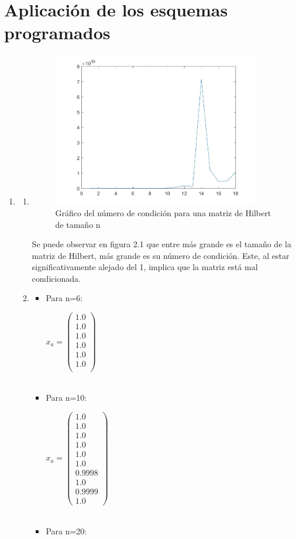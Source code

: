 \documentclass{udpreport}
\begin{document}
 \section{Aplicación de los esquemas programados}
 \begin{enumerate}
 	\item   
 		\begin{enumerate}
 			\item 	
 			\begin{figure}[H]
 				\centering
 				\includegraphics[width=9cm]{grafo1-a}
 				\caption{Gráfico del número de condición para una matriz de Hilbert de tamaño n}
 			\end{figure}
 			Se puede observar en figura 2.1 que entre más grande es el tamaño de la matriz de Hilbert, más grande es su número de condición. Este, al estar significativamente alejado del 1, implica que la matriz está mal condicionada.  %
 			\item 
 				\begin{itemize} 				
 				\item Para n=6:
 				
 				$x_{a} = \left(\begin{array}{c} 1.0\\ 1.0\\ 1.0\\ 1.0\\ 1.0\\ 1.0\\ \end{array}\right)$
 				\\
 				\\
 				\item Para n=10:
 				
 				$x_{a} = \left(\begin{array}{c} 1.0\\ 1.0\\ 1.0\\ 1.0\\ 1.0\\ 1.0\\ 0.9998\\ 1.0\\ 0.9999\\ 1.0 \end{array}\right)$
 				\\
 				\\
 				\item Para n=20:
 				

\end{itemize}
\end{enumerate}
\end{enumerate}
\end{document}

